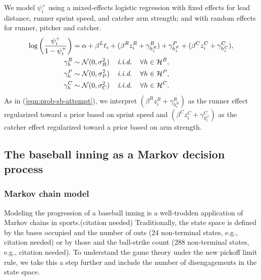 \documentclass{article}
\begin{document}
        We model $\psi_i^+$ using a mixed-effects logistic regression with fixed effects for lead distance, runner sprint speed, and catcher arm strength; and with random effects for runner, pitcher and catcher.
        \begin{align}
          \label{eqn:prob-sb-success}
          \begin{split}
            \log\left(\frac{\psi_i^+}{1 - \psi_i^+}\right) &= \alpha + \beta^L \ell_i + (\beta^R z_i^R + \gamma^R_{h_i^R}) + \gamma^P_{h_i^P} + (\beta^C z_i^C + \gamma^C_{h_i^C}),\\
            \gamma^R_{h} &\sim \mathcal{N}(0, \sigma^2_R) \hspace{4mm} \mbox{\it i.i.d.} \hspace{4mm} \forall h \in \mathcal{H}^R,\\
            \gamma^P_{h} &\sim \mathcal{N}(0, \sigma^2_P) \hspace{4mm} \mbox{\it i.i.d.} \hspace{4mm} \forall h \in \mathcal{H}^P,\\
            \gamma^C_{h} &\sim \mathcal{N}(0, \sigma^2_C) \hspace{4mm} \mbox{\it i.i.d.} \hspace{4mm} \forall h \in \mathcal{H}^C.
          \end{split}
        \end{align}
        As in (\ref{eqn:prob-sb-attempt}), we interpret $(\beta^R z_i^R + \gamma^R_{h_i^R})$ as the runner effect regularized toward a prior based on sprint speed and $(\beta^C z_i^C + \gamma^C_{h_i^C})$ as the catcher effect regularized toward a prior based on arm strength.

    \subsection{The baseball inning as a Markov decision process}

      \subsubsection{Markov chain model}

        Modeling the progression of a baseball inning is a well-trodden application of Markov chains in sports.(citation needed) Traditionally, the state space is defined by the bases occupied and the number of outs (24 non-terminal states, e.g., citation needed) or by those and the ball-strike count (288 non-terminal states, e.g., citation needed). To understand the game theory under the new pickoff limit rule, we take this a step further and include the number of disengagements in the state space.
      
\end{document}
